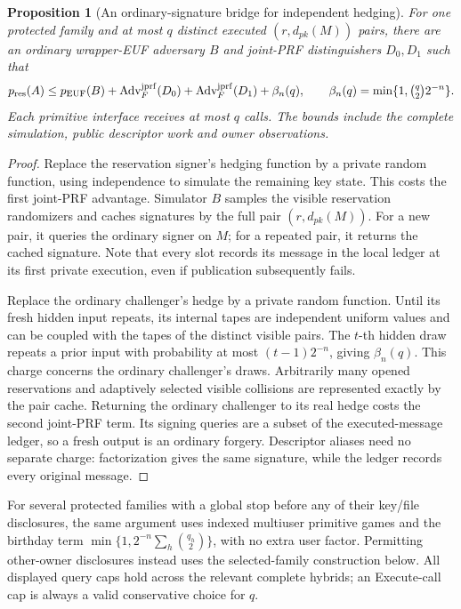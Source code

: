 \documentclass[pdflatex]{sn-jnl}
\theoremstyle{thmstyleone}
\newtheorem{proposition}[theorem]{Proposition}
\theoremstyle{thmstylethree}
\theoremstyle{thmstyletwo}
\begin{document}
\begin{proposition}[An ordinary-signature bridge for independent hedging]
\label{prop:independent-hedging-bridge}
For one protected family and at most $q$ distinct executed
$(r,d_{pk}(M))$ pairs, there are an ordinary wrapper-EUF adversary $B$ and
joint-PRF distinguishers $D_0,D_1$ such that
\begin{equation}
 p_{\rm res}(A)\le p_{\rm EUF}(B)
   +\operatorname{Adv}^{\rm jprf}_F(D_0)
   +\operatorname{Adv}^{\rm jprf}_F(D_1)
   +\beta_n(q),\qquad
 \beta_n(q)=\min\{1,\tbinom q2 2^{-n}\}.
 \label{eq:independent-hedging-bridge}
\end{equation}
Each primitive interface receives at most $q$ calls. The bounds include
the complete simulation, public descriptor work and owner observations.
\end{proposition}
\begin{proof}
Replace the reservation signer's hedging function by a private random
function, using independence to simulate the remaining key state. This
costs the first joint-PRF advantage. Simulator $B$ samples the visible
reservation randomizers and caches signatures by the full pair
$(r,d_{pk}(M))$. For a new pair, it queries the ordinary signer on
$M$; for a repeated pair, it returns the cached signature. Note that
every slot records its message in the local ledger at its first private
execution, even if publication subsequently fails.

Replace the ordinary challenger's hedge by a private random function.
Until its fresh hidden input repeats, its internal tapes are independent
uniform values and can be coupled with the tapes of the distinct visible
pairs. The $t$-th hidden draw repeats a prior input with probability at
most $(t-1)2^{-n}$, giving $\beta_n(q)$. This charge concerns the ordinary
challenger's draws. Arbitrarily many opened reservations and adaptively
selected visible collisions are represented exactly by the pair cache.
Returning the ordinary challenger to its real hedge costs the second
joint-PRF term. Its signing queries are a subset of the executed-message
ledger, so a fresh output is an ordinary forgery. Descriptor aliases need
no separate charge: factorization gives the same signature, while the
ledger records every original message.
\end{proof}

For several protected families with a global stop before any of their
key/file disclosures, the same argument uses indexed multiuser primitive
games and the birthday term
$\min\{1,2^{-n}\sum_h\binom{q_h}{2}\}$, with no extra user factor.
Permitting other-owner disclosures instead uses the selected-family
construction below. All displayed query caps hold across the relevant
complete hybrids; an Execute-call cap is always a valid conservative
choice for $q$.
\end{document}
